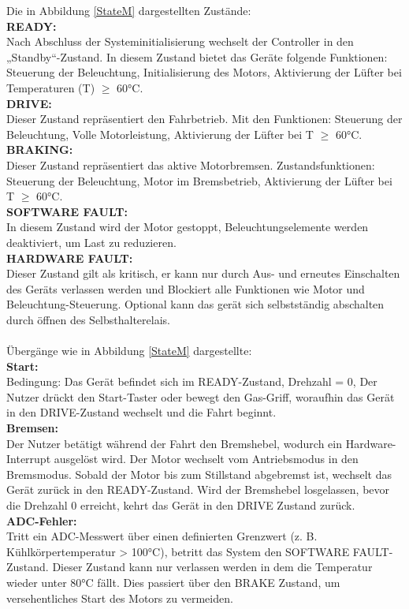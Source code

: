 \documentclass[paper=a4,11pt]{scrreprt}
\begin{document}
Die in Abbildung \ref{StateM} dargestellten Zustände:\\
\textbf{READY:}\\
Nach Abschluss der Systeminitialisierung wechselt der Controller in den „Standby“-Zustand.
In diesem Zustand bietet das Geräte folgende Funktionen:
Steuerung der Beleuchtung,
Initialisierung des Motors,
Aktivierung der Lüfter bei Temperaturen (T) $\geq$ 60°C.\\
\textbf{DRIVE:}\\
Dieser Zustand repräsentiert den Fahrbetrieb. Mit den Funktionen:
Steuerung der Beleuchtung,
Volle Motorleistung,
Aktivierung der Lüfter bei T $\geq$ 60°C.\\
\textbf{BRAKING:}\\
Dieser Zustand repräsentiert das aktive Motorbremsen.
Zustandsfunktionen:
Steuerung der Beleuchtung,
Motor im Bremsbetrieb,
Aktivierung der Lüfter bei T $\geq$ 60°C.\\
\textbf{SOFTWARE FAULT:}\\
In diesem Zustand wird der Motor gestoppt, Beleuchtungselemente werden deaktiviert, um Last zu reduzieren.\\
\textbf{HARDWARE FAULT:}\\
Dieser Zustand gilt als kritisch, er kann nur durch Aus- und erneutes Einschalten des Geräts verlassen werden und Blockiert alle Funktionen wie Motor und Beleuchtung-Steuerung.
Optional kann das gerät sich selbstständig abschalten durch öffnen des Selbsthalterelais.\\
\\
Übergänge wie in Abbildung \ref{StateM} dargestellte:\\
\textbf{Start:}\\
Bedingung: Das Gerät befindet sich im READY-Zustand, Drehzahl = 0,
Der Nutzer drückt den Start-Taster oder bewegt den Gas-Griff, woraufhin das Gerät in den DRIVE-Zustand wechselt und die Fahrt beginnt.\\
\textbf{Bremsen:}\\
Der Nutzer betätigt während der Fahrt den Bremshebel, wodurch ein Hardware-Interrupt ausgelöst wird.
Der Motor wechselt vom Antriebsmodus in den Bremsmodus.
Sobald der Motor bis zum Stillstand abgebremst ist, wechselt das Gerät zurück in den READY-Zustand. Wird der Bremshebel losgelassen, bevor die Drehzahl 0 erreicht, kehrt das Gerät in den DRIVE Zustand zurück.\\
\textbf{ADC-Fehler:}\\
Tritt ein ADC-Messwert über einen definierten Grenzwert (z. B. Kühlkörpertemperatur > 100°C), betritt das System den SOFTWARE FAULT-Zustand. Dieser Zustand kann nur verlassen werden in dem die Temperatur wieder unter 80°C fällt. Dies passiert über den BRAKE Zustand, um versehentliches Start des Motors zu vermeiden.\\
\end{document}
